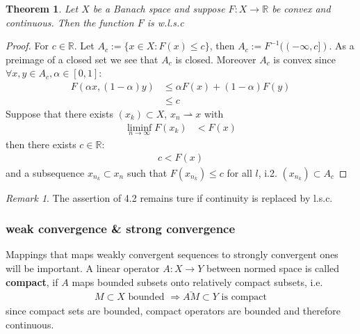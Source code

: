 \documentclass[a4paper,11pt,fleqn]{book}
\newtheorem{theorem}{Theorem}[section]
\theoremstyle{definition}
\theoremstyle{remark}
\newtheorem*{remark}{Remark}
\begin{document}
\begin{theorem}
	Let $X$ be a Banach space and suppose $F: X \rightarrow \mathbb{R}$ be convex and continuous. Then the function $F$ is w.l.s.c
\end{theorem}
\begin{proof}
	For $c \in \mathbb{R}$. Let $A_c:= \{x \in X: F(x) \le c\}$, then $A_c:= F^{-1}((-\infty, c])$. As a preimage of a closed set we see that $A_c$ is closed. Moreover $A_c$ is convex since $\forall x, y \in A_c, \alpha \in [0, 1]:$
	\begin{align*}
		F(\alpha x, (1 - \alpha)y ) &\le \alpha F(x) + (1 - \alpha)F(y)\\
		&\le c
	\end{align*}
	Suppose that there exists $(x_k) \subset X$, $x_n \rightharpoonup x$ with 
	\begin{align*}
		\liminf_{n \rightarrow \infty} F(x_k) &< F(x)
	\end{align*}
	then there exists $c \in \mathbb{R}:$
	\begin{align*}
		c < F(x)
	\end{align*}
	and a subsequence $x_{n_k} \subset x_n$ such that
	$F(x_{n_k}) \le c$ for all $l$, i.2. $(x_{n_k}) \subset A_c$
\end{proof}
\begin{remark}
The assertion of 4.2 remains ture if continuity is replaced by l.s.c. 	
\end{remark}


\subsubsection*{weak convergence \& strong convergence}
Mappings that maps weakly convergent sequences to strongly convergent ones will be important. A linear operator $A: X \rightarrow Y$ between normed space is called \textbf{compact}, if $A$ maps bounded subsets onto relatively compact subsets, i.e.
\begin{align*}
	M \subset X \text{ bounded } \Rightarrow \bar{AM} \subset Y \text{ is compact}
\end{align*}
since compact sets are bounded, compact operators are bounded and therefore continuous. 
\end{document}
